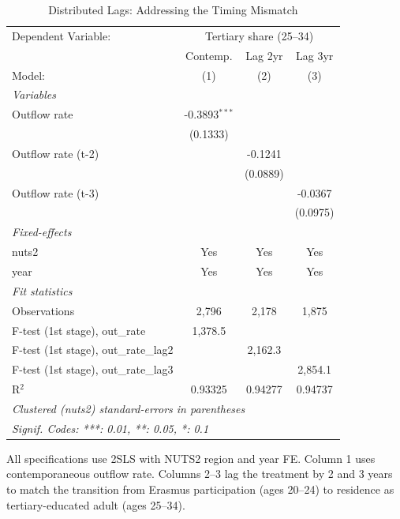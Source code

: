 \begin{table}[htbp]
   \caption{\label{tab:lags} Distributed Lags: Addressing the Timing Mismatch}
   \centering
   \scriptsize
   \begin{tabular}{lccc}
      \tabularnewline \midrule \midrule
      Dependent Variable: & \multicolumn{3}{c}{Tertiary share (25--34)}\\
                                            & Contemp.        & Lag 2yr  & Lag 3yr \\   
      Model:                                & (1)             & (2)      & (3)\\  
      \midrule
      \emph{Variables}\\
      Outflow rate                          & -0.3893$^{***}$ &          &   \\   
                                            & (0.1333)        &          &   \\   
      Outflow rate (t-2)                    &                 & -0.1241  &   \\   
                                            &                 & (0.0889) &   \\   
      Outflow rate (t-3)                    &                 &          & -0.0367\\   
                                            &                 &          & (0.0975)\\   
      \midrule
      \emph{Fixed-effects}\\
      nuts2                                 & Yes             & Yes      & Yes\\  
      year                                  & Yes             & Yes      & Yes\\  
      \midrule
      \emph{Fit statistics}\\
      Observations                          & 2,796           & 2,178    & 1,875\\  
      F-test (1st stage), out\_rate         & 1,378.5         &          & \\  
      F-test (1st stage), out\_rate\_lag2   &                 & 2,162.3  & \\  
      F-test (1st stage), out\_rate\_lag3   &                 &          & 2,854.1\\  
      R$^2$                                 & 0.93325         & 0.94277  & 0.94737\\  
      \midrule \midrule
      \multicolumn{4}{l}{\emph{Clustered (nuts2) standard-errors in parentheses}}\\
      \multicolumn{4}{l}{\emph{Signif. Codes: ***: 0.01, **: 0.05, *: 0.1}}\\
   \end{tabular}
   
   \par \raggedright 
   All specifications use 2SLS with NUTS2 region and year FE. Column 1 uses contemporaneous outflow rate. Columns 2--3 lag the treatment by 2 and 3 years to match the transition from Erasmus participation (ages 20--24) to residence as tertiary-educated adult (ages 25--34).
\end{table}
